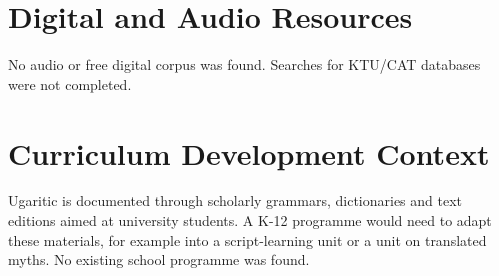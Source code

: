 \documentclass[12pt]{article}
\begin{document}
\section{Digital and Audio Resources}
No audio or free digital corpus was found. Searches for KTU/CAT databases were not completed.
\section{Curriculum Development Context}
Ugaritic is documented through scholarly grammars, dictionaries and text editions aimed at university students. A K-12 programme would need to adapt these materials, for example into a script-learning unit or a unit on translated myths. No existing school programme was found.
\end{document}

